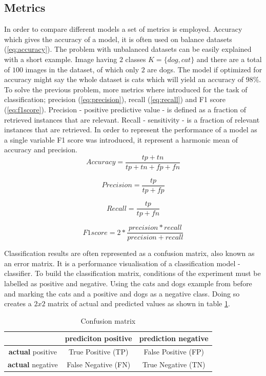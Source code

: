 \documentclass[times, utf8, diplomski]{fer}
\begin{document}
\subsection{Metrics}
In order to compare different models a set of metrics is employed. Accuracy which gives the accuracy of a model, it is often used on balance datasets (\ref{eq:accuracy}). The problem with unbalanced datasets can be easily explained with a short example. Image having $2$ classes $K=\{dog,cat\}$ and there are a total of $100$ images in the dataset, of which only $2$ are dogs. The model if optimized for accuracy might say the whole dataset is cats which will yield an accuracy of $98\%$. To solve the previous problem, more metrics where introduced for the task of classification; precision (\ref{eq:precision}), recall (\ref{eq:recall}) and F1 score (\ref{eq:f1score}). Precision - positive predictive value - is defined as a fraction of retrieved instances that are relevant. Recall - sensitivity - is a fraction of relevant instances that are retrieved. In order to represent the performance of a model as a single variable F1 score was introduced, it represent a harmonic mean of accuracy and precision.
\begin{equation} \label{eq:accuracy}
	Accuracy = \frac{tp + tn}{tp + tn + fp + fn}
\end{equation}

\begin{equation} \label{eq:precision}
	Precision = \frac{tp}{tp + fp}
\end{equation}

\begin{equation} \label{eq:recall}
	Recall = \frac{tp}{tp + fn}
\end{equation}

\begin{equation} \label{eq:f1score}
	F1 score = 2 * \frac{precision * recall}{precision + recall}
\end{equation}


Classification results are often represented as a confusion matrix, also known as an error matrix.  It is a performance visualisation of a classification model - classifier. To build the classification matrix, conditions of the experiment must be labelled as positive and negative. Using the cats and dogs example from before and marking the cats and a positive and dogs as a negative class. Doing so creates a $2x2$ matrix of actual and predicted values as shown in table \ref{tb:confusion_matrix}.

\begin{table}
\centering
\caption{Confusion matrix}
\label{tb:confusion_matrix}
\begin{tabular}{|c|c|c|}
\hline 
 & \textbf{prediciton} positive & \textbf{prediction} negative \\ 
\hline 
\textbf{actual} positive & True Positive (TP) & False Positive (FP) \\ 
\hline 
\textbf{actual} negative & False Negative (FN) & True Negative (TN) \\ 
\hline 
\end{tabular}
\end{table}
\end{document}
